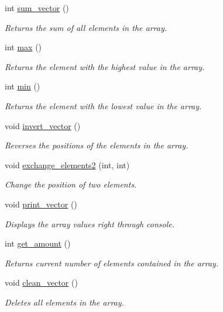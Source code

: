 \begin{DoxyCompactItemize}
int \hyperlink{classarray_adc0ddb6f7348edf390b97e883f4ee773}{sum\-\_\-vector} ()
\begin{DoxyCompactList}\small\item\em Returns the sum of all elements in the array. \end{DoxyCompactList}\item 
int \hyperlink{classarray_aae5279d424036f187c6aa516bbd83c5c}{max} ()
\begin{DoxyCompactList}\small\item\em Returns the element with the highest value in the array. \end{DoxyCompactList}\item 
int \hyperlink{classarray_a9787f152f19d3efaa10661fd8ab5d984}{min} ()
\begin{DoxyCompactList}\small\item\em Returns the element with the lowest value in the array. \end{DoxyCompactList}\item 
void \hyperlink{classarray_a00636253b1ad091fc26e9d390188ce9e}{invert\-\_\-vector} ()
\begin{DoxyCompactList}\small\item\em Reverses the positions of the elements ​​in the array. \end{DoxyCompactList}\item 
void \hyperlink{classarray_a38eae774a7eba29581bf399f33309ffc}{exchange\-\_\-elements2} (int, int)
\begin{DoxyCompactList}\small\item\em Change the position of two elements. \end{DoxyCompactList}\item 
void \hyperlink{classarray_a6fc40f0a530525bb91835af4dcd20565}{print\-\_\-vector} ()
\begin{DoxyCompactList}\small\item\em Displays the array values right through console. \end{DoxyCompactList}\item 
int \hyperlink{classarray_a1e2e2da0c5c43d2a2c6f932036868d38}{get\-\_\-amount} ()
\begin{DoxyCompactList}\small\item\em Returns current number of elements contained in the array. \end{DoxyCompactList}\item 
void \hyperlink{classarray_a22cb040428decbd6b5b4d4be8c03cfd0}{clean\-\_\-vector} ()
\begin{DoxyCompactList}\small\item\em Deletes all elements in the array. \end{DoxyCompactList}\item 

\end{DoxyCompactItemize}
